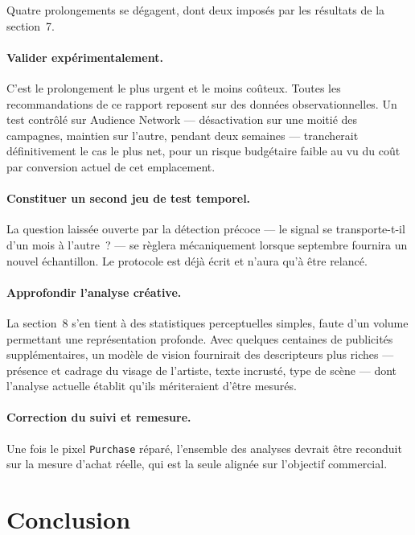 \documentclass[11pt,a4paper]{article}
\newcommand{\code}[1]{\texttt{\small #1}}
\begin{document}
Quatre prolongements se dégagent, dont deux imposés par les résultats de la
section~7.

\paragraph{Valider expérimentalement.}
C'est le prolongement le plus urgent et le moins coûteux. Toutes les
recommandations de ce rapport reposent sur des données observationnelles. Un
test contrôlé sur Audience Network --- désactivation sur une moitié des
campagnes, maintien sur l'autre, pendant deux semaines --- trancherait
définitivement le cas le plus net, pour un risque budgétaire faible au vu du
coût par conversion actuel de cet emplacement.

\paragraph{Constituer un second jeu de test temporel.}
La question laissée ouverte par la détection précoce --- le signal se
transporte-t-il d'un mois à l'autre~? --- se règlera mécaniquement lorsque
septembre fournira un nouvel échantillon. Le protocole est déjà écrit et
n'aura qu'à être relancé.

\paragraph{Approfondir l'analyse créative.}
La section~8 s'en tient à des statistiques perceptuelles simples, faute d'un
volume permettant une représentation profonde. Avec quelques centaines de
publicités supplémentaires, un modèle de vision fournirait des descripteurs
plus riches --- présence et cadrage du visage de l'artiste, texte incrusté,
type de scène --- dont l'analyse actuelle établit qu'ils mériteraient d'être
mesurés.

\paragraph{Correction du suivi et remesure.}
Une fois le pixel \code{Purchase} réparé, l'ensemble des analyses devrait être
reconduit sur la mesure d'achat réelle, qui est la seule alignée sur l'objectif
commercial.

\section{Conclusion}
\end{document}
